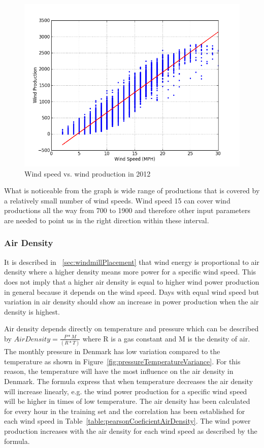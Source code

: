 \begin{figure}[H]
\centering
\includegraphics[width=0.99\linewidth,natwidth=898,natheight=587]{billeder/WindSpeedVsProduction.png}
\caption{Wind speed vs. wind production in 2012}
\label{fig:windVsProd}
\end{figure}

What is noticeable from the graph is wide range of productions that is covered by a relatively small number of wind speeds. Wind speed 15 can cover wind productions all the way from 700 to 1900 and therefore other input parameters are needed to point us in the right direction within these interval. 

\subsubsection{Air Density}
It is described in ~\ref{sec:windmillPlacement} that wind energy is proportional to air density where a higher density means more power for a specific wind speed. This does not imply that a higher air density is equal to higher wind power production in general because it depends on the wind speed. Days with equal wind speed but variation in air density should show an increase in power production when the air density is highest. 

Air density depends directly on temperature and pressure which can be described by $Air Density=\frac{P*M}{(R*T)}$ where R is a gas constant and M is the density of air. The monthly pressure in Denmark has low variation compared to the temperature as shown in Figure~\ref{fig:pressureTemperatureVariance}. For this reason, the temperature will have the most influence on the air density in Denmark. The formula express that when temperature decreases the air density will increase linearly, e.g. the wind power production for a specific wind speed will be higher in times of low temperature. The air density has been calculated for every hour in the training set and the correlation has been established for each wind speed in Table~\ref{table:pearsonCoeficientAirDensity}. The wind power production increases with the air density for each wind speed as described by the formula.

